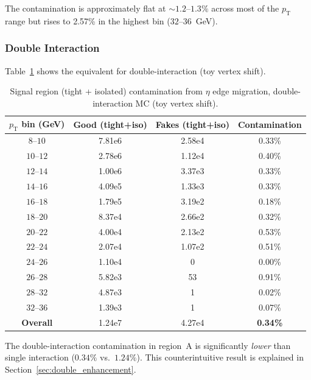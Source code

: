 \documentclass[11pt,letterpaper]{article}
\providecommand{\num}[1]{#1}  %
\newcommand{\pT}{\ensuremath{p_{\text{T}}}}
\begin{document}
The contamination is approximately flat at ${\sim}1.2$--$1.3\%$ across most of
the $\pT$ range but rises to 2.57\% in the highest bin ($32$--$36$~GeV).

\subsubsection{Double Interaction}

Table~\ref{tab:signal_double} shows the equivalent for double-interaction
(toy vertex shift).

\begin{table}[htbp]
\centering
\caption{Signal region (tight + isolated) contamination from $\eta$ edge
  migration, double-interaction MC (toy vertex shift).}
\label{tab:signal_double}
\begin{tabular}{cccc}
\toprule
$\pT$ bin (GeV) & Good (tight+iso) & Fakes (tight+iso) & Contamination \\
\midrule
$8$--$10$   & \num{7.81e6} & \num{2.58e4} & 0.33\% \\
$10$--$12$  & \num{2.78e6} & \num{1.12e4} & 0.40\% \\
$12$--$14$  & \num{1.00e6} & \num{3.37e3} & 0.33\% \\
$14$--$16$  & \num{4.09e5} & \num{1.33e3} & 0.33\% \\
$16$--$18$  & \num{1.79e5} & \num{3.19e2} & 0.18\% \\
$18$--$20$  & \num{8.37e4} & \num{2.66e2} & 0.32\% \\
$20$--$22$  & \num{4.00e4} & \num{2.13e2} & 0.53\% \\
$22$--$24$  & \num{2.07e4} & \num{1.07e2} & 0.51\% \\
$24$--$26$  & \num{1.10e4} & 0             & 0.00\% \\
$26$--$28$  & \num{5.82e3} & 53            & 0.91\% \\
$28$--$32$  & \num{4.87e3} & 1             & 0.02\% \\
$32$--$36$  & \num{1.39e3} & 1             & 0.07\% \\
\midrule
\textbf{Overall} & \num{1.24e7} & \num{4.27e4} & \textbf{0.34\%} \\
\bottomrule
\end{tabular}
\end{table}

The double-interaction contamination in region~A is significantly \emph{lower}
than single interaction ($0.34\%$ vs.\ $1.24\%$). This counterintuitive result
is explained in Section~\ref{sec:double_enhancement}.
\end{document}
